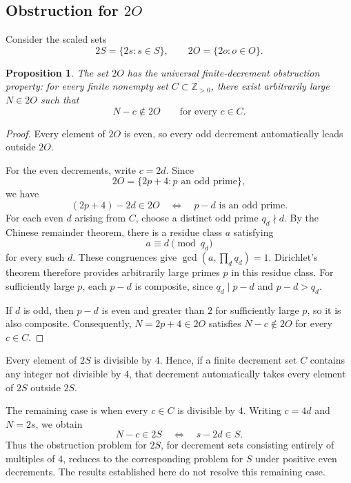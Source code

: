 \documentclass[11pt]{article}
\newtheorem{proposition}{Proposition}
\begin{document}
	\subsection{Obstruction for $2O$}
	
	Consider the scaled sets
	\[
	2S=\{2s:s\in S\},\qquad
	2O=\{2o:o\in O\}.
	\]
	
	
	\begin{proposition}
		The set \(2O\) has the universal finite-decrement
		obstruction property: for every finite nonempty set
		\(C\subset\mathbb{Z}_{>0}\), there exist arbitrarily large
		\(N\in 2O\) such that
		\[
		N-c\notin 2O\qquad\text{for every }c\in C.
		\]
	\end{proposition}
	
	\begin{proof}
		Every element of \(2O\) is even, so every odd decrement
		automatically leads outside \(2O\).
		
		For the even decrements, write \(c=2d\). Since
		\[
		2O=\{2p+4:p\text{ an odd prime}\},
		\]
		we have
		\[
		(2p+4)-2d\in 2O
		\quad\Longleftrightarrow\quad
		p-d\text{ is an odd prime}.
		\]
		For each even \(d\) arising from \(C\), choose a distinct
		odd prime \(q_d\nmid d\). By the Chinese remainder theorem,
		there is a residue class \(a\) satisfying
		\[
		a\equiv d\pmod{q_d}
		\]
		for every such \(d\). These congruences give
		\(\gcd(a,\prod_d q_d)=1\). Dirichlet's theorem therefore
		provides arbitrarily large primes \(p\) in this residue
		class. For sufficiently large \(p\), each \(p-d\) is
		composite, since \(q_d\mid p-d\) and \(p-d>q_d\).
		
		If \(d\) is odd, then \(p-d\) is even and greater than \(2\)
		for sufficiently large \(p\), so it is also composite.
		Consequently, \(N=2p+4\in 2O\) satisfies
		\(N-c\notin 2O\) for every \(c\in C\).
	\end{proof}
	
	\medskip
	
	Every element of \(2S\) is divisible by \(4\). Hence, if a
	finite decrement set \(C\) contains any integer not
	divisible by \(4\), that decrement automatically takes
	every element of \(2S\) outside \(2S\).
	
	The remaining case is when every \(c\in C\) is divisible
	by \(4\). Writing \(c=4d\) and \(N=2s\), we obtain
	\[
	N-c\in 2S
	\quad\Longleftrightarrow\quad
	s-2d\in S.
	\]
	Thus the obstruction problem for \(2S\), for decrement
	sets consisting entirely of multiples of \(4\), reduces
	to the corresponding problem for \(S\) under positive
	even decrements. The results established here do not
	resolve this remaining case.
	
\end{document}
